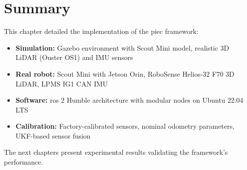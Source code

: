 \section{Summary}

This chapter detailed the implementation of the \acrshort{piec} framework:
\begin{itemize}
    \item \textbf{Simulation:} Gazebo environment with Scout Mini model, realistic 3D LiDAR (Ouster OS1) and IMU sensors
    \item \textbf{Real robot:} Scout Mini with Jetson Orin, RoboSense Helios-32 F70 3D LiDAR, LPMS IG1 CAN IMU
    \item \textbf{Software:} \acrshort{ros} 2 Humble architecture with modular nodes on Ubuntu 22.04 LTS
    \item \textbf{Calibration:} Factory-calibrated sensors, nominal odometry parameters, UKF-based sensor fusion
\end{itemize}

The next chapters present experimental results validating the framework's performance.



